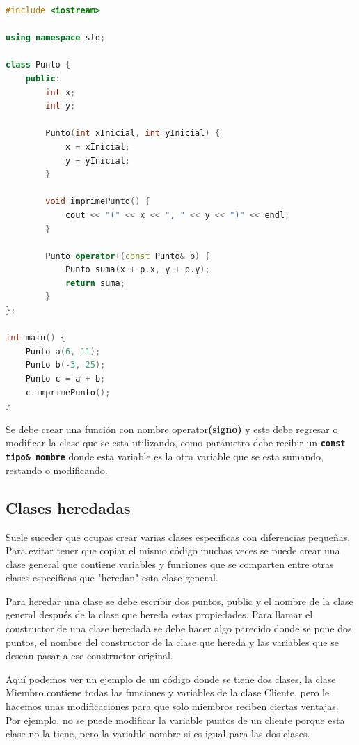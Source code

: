 \documentclass{article}
\begin{document}
\begin{lstlisting}[language=C++, title=Sobrecargamiento de operadores]
#include <iostream>

using namespace std;

class Punto {
	public:
		int x;
		int y;

		Punto(int xInicial, int yInicial) {
			x = xInicial;
			y = yInicial;
		}

		void imprimePunto() {
			cout << "(" << x << ", " << y << ")" << endl;
		}

		Punto operator+(const Punto& p) {
			Punto suma(x + p.x, y + p.y);
			return suma;
		}
};

int main() {
	Punto a(6, 11);
	Punto b(-3, 25);
	Punto c = a + b;
	c.imprimePunto();
}
\end{lstlisting}

Se debe crear una función con nombre operator\textbf{(signo)} y este debe regresar o modificar la clase que se esta utilizando, como parámetro debe recibir un \textbf{\lstinline{const tipo& nombre}} donde esta variable es la otra variable que se esta sumando, restando o modificando.

\subsection{Clases heredadas}

Suele suceder que ocupas crear varias clases especificas con diferencias pequeñas. Para evitar tener que copiar el mismo código muchas veces se puede crear una clase general que contiene variables y funciones que se comparten entre otras clases especificas que "heredan" esta clase general.

Para heredar una clase se debe escribir dos puntos, public y el nombre de la clase general después de la clase que hereda estas propiedades. Para llamar el constructor de una clase heredada se debe hacer algo parecido donde se pone dos puntos, el nombre del constructor de la clase que hereda y las variables que se desean pasar a ese constructor original.

Aquí podemos ver un ejemplo de un código donde se tiene dos clases, la clase Miembro contiene todas las funciones y variables de la clase Cliente, pero le hacemos unas modificaciones para que solo miembros reciben ciertas ventajas. Por ejemplo, no se puede modificar la variable puntos de un cliente porque esta clase no la tiene, pero la variable nombre si es igual para las dos clases.
\end{document}
